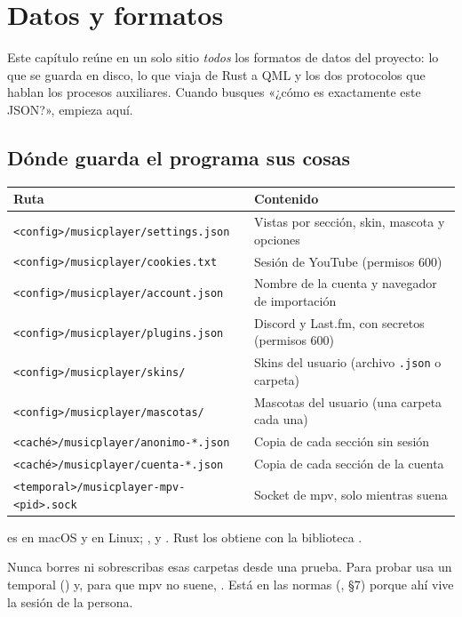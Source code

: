 \chapter{Datos y formatos}
\label{cap:datos}

Este capítulo reúne en un solo sitio \emph{todos} los formatos de datos del proyecto: lo que
se guarda en disco, lo que viaja de Rust a QML y los dos protocolos que hablan los procesos
auxiliares. Cuando busques «¿cómo es exactamente este JSON?», empieza aquí.

\section{Dónde guarda el programa sus cosas}

\begin{center}
\small
\begin{tabularx}{\linewidth}{@{}lX@{}}
\toprule
Ruta & Contenido \\
\midrule
\texttt{<config>/musicplayer/settings.json} & Vistas por sección, skin, mascota y opciones \\
\texttt{<config>/musicplayer/cookies.txt} & Sesión de YouTube (permisos 600) \\
\texttt{<config>/musicplayer/account.json} & Nombre de la cuenta y navegador de importación \\
\texttt{<config>/musicplayer/plugins.json} & Discord y Last.fm, con secretos (permisos 600) \\
\texttt{<config>/musicplayer/skins/} & Skins del usuario (archivo \texttt{.json} o carpeta) \\
\texttt{<config>/musicplayer/mascotas/} & Mascotas del usuario (una carpeta cada una) \\
\texttt{<caché>/musicplayer/anonimo-*.json} & Copia de cada sección sin sesión \\
\texttt{<caché>/musicplayer/cuenta-*.json} & Copia de cada sección de la cuenta \\
\texttt{<temporal>/musicplayer-mpv-<pid>.sock} & Socket de mpv, solo mientras suena \\
\bottomrule
\end{tabularx}
\end{center}

 es  en macOS y  en Linux;
,  y . Rust los obtiene con la biblioteca
.

\begin{trampa}
Nunca borres ni sobrescribas esas carpetas desde una prueba. Para probar usa un 
temporal () y, para que mpv no suene, .
Está en las normas (, §7) porque ahí vive la sesión de la persona.
\end{trampa}

